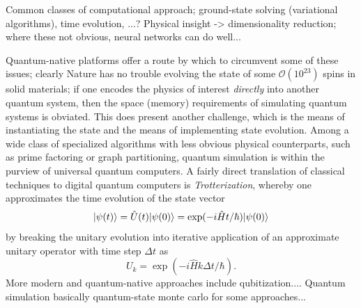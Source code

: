 	Common classes of computational approach; ground-state solving (variational algorithms), time evolution, ...?
	Physical insight -> dimensionality reduction; where these not obvious, neural networks can do well...

	Quantum-native platforms offer a route by which to circumvent some of these issues; clearly Nature has no trouble evolving the state of some $\mathcal{O}(10^23)$ spins in solid materials; if one encodes the physics of interest \emph{directly} into another quantum system, then the space (memory) requirements of simulating quantum systems is obviated. This does present another challenge, which is the means of instantiating the state and the means of implementing state evolution. Among a wide class of specialized algorithms with less obvious physical counterparts, such as prime factoring or graph partitioning, quantum simulation is within the purview of universal quantum computers. A fairly direct translation of classical techniques to digital quantum computers is \emph{Trotterization}, whereby one approximates the time evolution of the state vector
	\begin{equation}
		|\psi(t)\rangle = \hat{U}(t)|\psi(0)\rangle = \exp(-i\hat{H}t/\hbar)|\psi(0)\rangle
	\end{equation}
	by breaking the unitary evolution into iterative application of an approximate unitary operator with time step $\Delta t$ as
	\begin{equation}
		U_{k} = \exp(-i\hat{H}k\Delta t/\hbar).
	\end{equation}
	More modern and quantum-native approaches include qubitization....
	Quantum simulation basically quantum-state monte carlo for some approaches...

